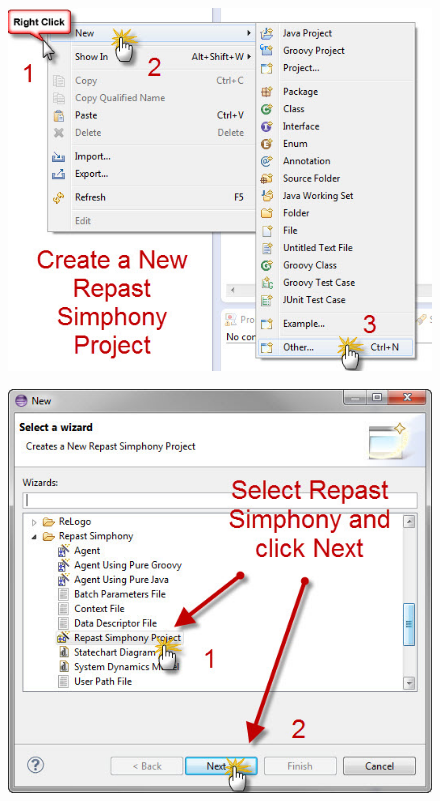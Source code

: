 \documentclass[11pt]{amsart}
\begin{document}
\begin{figure}[ht]
\begin{center}
\vspace{.2in}
\centerline {
\includegraphics[totalheight=0.35\textheight]{images/002.jpg}
}
\caption{}
\label{fig:002}
\end{center}
\end{figure}




\begin{figure}[ht]
\begin{center}
\vspace{.2in}
\centerline {
\includegraphics[totalheight=0.35\textheight]{images/003.jpg}
}
\caption{}
\label{fig:003}
\end{center}
\end{figure}
\end{document}
